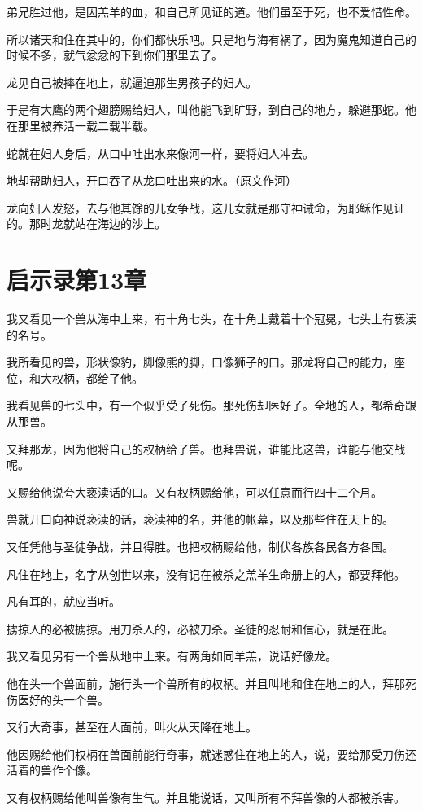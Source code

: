 \documentclass[12pt,oneside]{book}
\begin{document}
弟兄胜过他，是因羔羊的血，和自己所见证的道。他们虽至于死，也不爱惜性命。

所以诸天和住在其中的，你们都快乐吧。只是地与海有祸了，因为魔鬼知道自己的时候不多，就气忿忿的下到你们那里去了。

龙见自己被摔在地上，就逼迫那生男孩子的妇人。

于是有大鹰的两个翅膀赐给妇人，叫他能飞到旷野，到自己的地方，躲避那蛇。他在那里被养活一载二载半载。

蛇就在妇人身后，从口中吐出水来像河一样，要将妇人冲去。

地却帮助妇人，开口吞了从龙口吐出来的水。（原文作河）

龙向妇人发怒，去与他其馀的儿女争战，这儿女就是那守神诫命，为耶稣作见证的。那时龙就站在海边的沙上。

\chapter{启示录第13章}
我又看见一个兽从海中上来，有十角七头，在十角上戴着十个冠冕，七头上有亵渎的名号。

我所看见的兽，形状像豹，脚像熊的脚，口像狮子的口。那龙将自己的能力，座位，和大权柄，都给了他。

我看见兽的七头中，有一个似乎受了死伤。那死伤却医好了。全地的人，都希奇跟从那兽。

又拜那龙，因为他将自己的权柄给了兽。也拜兽说，谁能比这兽，谁能与他交战呢。

又赐给他说夸大亵渎话的口。又有权柄赐给他，可以任意而行四十二个月。

兽就开口向神说亵渎的话，亵渎神的名，并他的帐幕，以及那些住在天上的。

又任凭他与圣徒争战，并且得胜。也把权柄赐给他，制伏各族各民各方各国。

凡住在地上，名字从创世以来，没有记在被杀之羔羊生命册上的人，都要拜他。

凡有耳的，就应当听。

掳掠人的必被掳掠。用刀杀人的，必被刀杀。圣徒的忍耐和信心，就是在此。

我又看见另有一个兽从地中上来。有两角如同羊羔，说话好像龙。

他在头一个兽面前，施行头一个兽所有的权柄。并且叫地和住在地上的人，拜那死伤医好的头一个兽。

又行大奇事，甚至在人面前，叫火从天降在地上。

他因赐给他们权柄在兽面前能行奇事，就迷惑住在地上的人，说，要给那受刀伤还活着的兽作个像。

又有权柄赐给他叫兽像有生气。并且能说话，又叫所有不拜兽像的人都被杀害。
\end{document}
